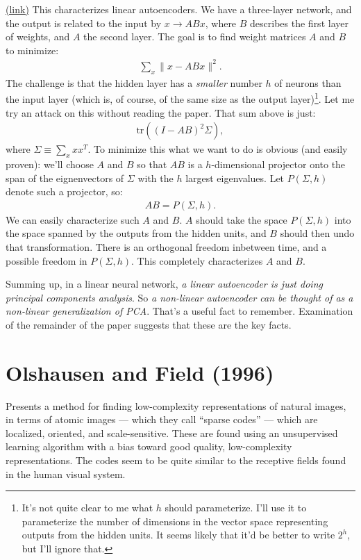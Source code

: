 \documentclass[12pt]{report}
\newcommand{\link}[2]{\href{#1}{#2}}
\begin{document}
\link{http://scholar.google.ca/scholar?cluster=11637720331851320383&hl=en&as_sdt=0,5}{(link)}
This characterizes linear autoencoders.  We have a three-layer
network, and the output is related to the input by $x \rightarrow
ABx$, where $B$ describes the first layer of weights, and $A$ the
second layer.  The goal is to find weight matrices $A$ and $B$ to
minimize:
\begin{eqnarray}
\sum_x \|x-ABx\|^2.
\end{eqnarray}
The challenge is that the hidden layer has a \emph{smaller} number $h$
of neurons than the input layer (which is, of course, of the same size
as the output layer)\footnote{It's not quite clear to me what $h$
  should parameterize.  I'll use it to parameterize the number of
  dimensions in the vector space representing outputs from the hidden
  units.  It seems likely that it'd be better to write $2^h$, but I'll
  ignore that.}.  Let me try an attack on this without reading the
paper.  That sum above is just:
\begin{eqnarray}
\mbox{tr}((I-AB)^2 \Sigma),
\end{eqnarray}
where $\Sigma \equiv \sum_x x x^T$.  To minimize this what we want to
do is obvious (and easily proven): we'll choose $A$ and $B$ so that
$AB$ is a $h$-dimensional projector onto the span of the eignenvectors
of $\Sigma$ with the $h$ largest eigenvalues.  Let $P(\Sigma, h)$
denote such a projector, so:
\begin{eqnarray}
AB = P(\Sigma, h).
\end{eqnarray}
We can easily characterize such $A$ and $B$.  $A$ should take the
space $P(\Sigma, h)$ into the space spanned by the outputs from the
hidden units, and $B$ should then undo that transformation.  There is
an orthogonal freedom inbetween time, and a possible freedom in
$P(\Sigma, h)$.  This completely characterizes $A$ and $B$.

Summing up, in a linear neural network, \emph{a linear autoencoder is
  just doing principal components analysis}.  So \emph{a non-linear
  autoencoder can be thought of as a non-linear generalization of
  PCA}.  That's a useful fact to remember.  Examination of the
remainder of the paper suggests that these are the key facts.

\section{Olshausen and Field  (1996)} 

Presents a method for finding low-complexity representations of
natural images, in terms of atomic images --- which they call ``sparse
codes'' --- which are localized, oriented, and scale-sensitive.  These
are found using an unsupervised learning algorithm with a bias toward
good quality, low-complexity representations.  The codes seem to be
quite similar to the receptive fields found in the human visual
system.
\end{document}
